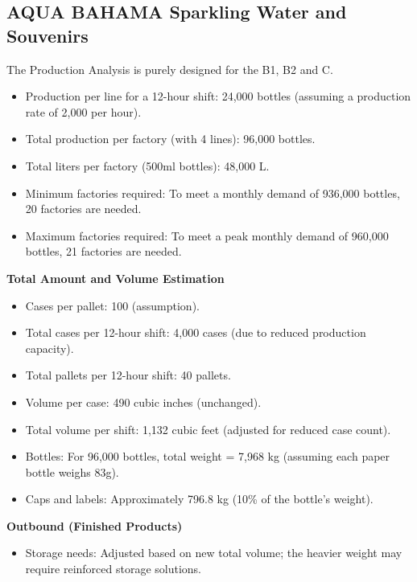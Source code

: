\documentclass{article}
\begin{document}
\subsection{AQUA BAHAMA Sparkling Water and Souvenirs}\par
The Production Analysis is purely designed for the B1, B2 and C.\par
\begin{itemize}
    \item Production per line for a 12-hour shift: 24,000 bottles (assuming a production rate of 2,000 per hour).
    \item Total production per factory (with 4 lines): 96,000 bottles.
    \item Total liters per factory (500ml bottles): 48,000 L.
    \item Minimum factories required: To meet a monthly demand of 936,000 bottles, 20 factories are needed.
    \item Maximum factories required: To meet a peak monthly demand of 960,000 bottles, 21 factories are needed.
\end{itemize}

\textbf{Total Amount and Volume Estimation}\par
\begin{itemize}
    \item Cases per pallet: 100 (assumption).
    \item Total cases per 12-hour shift: 4,000 cases (due to reduced production capacity).
    \item Total pallets per 12-hour shift: 40 pallets.
    \item Volume per case: 490 cubic inches (unchanged).
    \item Total volume per shift: 1,132 cubic feet (adjusted for reduced case count).
\end{itemize}
\begin{itemize}
    \item Bottles: For 96,000 bottles, total weight = 7,968 kg (assuming each paper bottle weighs 83g).
    \item Caps and labels: Approximately 796.8 kg (10\% of the bottle's weight).
\end{itemize}

\textbf{Outbound (Finished Products)}\par
\begin{itemize}
    \item Storage needs: Adjusted based on new total volume; the heavier weight may require reinforced storage solutions.
\end{itemize}
\end{document}
